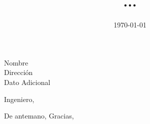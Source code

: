 \documentclass[11pt, twoside]{aletter}
\date{\today}
\title{...}
\begin{document}

\renewcommand*{\makecopy}[2]{
\begin{letter}{#2}
\opening{#1}




%



\vspace*{0mm} %
\closing{De antemano, Gracias,
\vspace{0mm} %
}
\vspace*{0mm} %


\end{letter}
} %

\makecopy{Ingeniero,}{Nombre\\Direcci\'on\\Dato Adicional}

%
\end{document}
